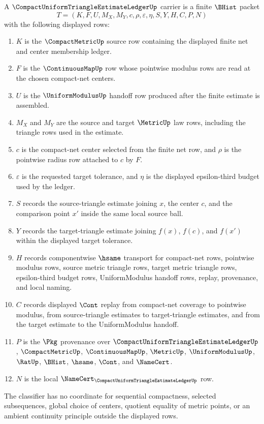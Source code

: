 \begin{definition}
\label{def:compact-uniform-triangle-estimate-ledger-carrier}
A $\CompactUniformTriangleEstimateLedgerUp$ carrier is a finite $\BHist$ packet
$$
T=(K,F,U,M_X,M_Y,c,\rho,\varepsilon,\eta,S,Y,H,C,P,N)
$$
with the following displayed rows:
\begin{enumerate}
\item $K$ is the $\CompactMetricUp$ source row containing the displayed finite net and center membership ledger.
\item $F$ is the $\ContinuousMapUp$ row whose pointwise modulus rows are read at the chosen compact-net centers.
\item $U$ is the $\UniformModulusUp$ handoff row produced after the finite estimate is assembled.
\item $M_X$ and $M_Y$ are the source and target $\MetricUp$ law rows, including the triangle rows used in the estimate.
\item $c$ is the compact-net center selected from the finite net row, and $\rho$ is the pointwise radius row attached to $c$ by $F$.
\item $\varepsilon$ is the requested target tolerance, and $\eta$ is the displayed epsilon-third budget used by the ledger.
\item $S$ records the source-triangle estimate joining $x$, the center $c$, and the comparison point $x'$ inside the same local source ball.
\item $Y$ records the target-triangle estimate joining $f(x)$, $f(c)$, and $f(x')$ within the displayed target tolerance.
\item $H$ records componentwise $\hsame$ transport for compact-net rows, pointwise modulus rows, source metric triangle rows, target metric triangle rows, epsilon-third budget rows, UniformModulus handoff rows, replay, provenance, and local naming.
\item $C$ records displayed $\Cont$ replay from compact-net coverage to pointwise modulus, from source-triangle estimates to target-triangle estimates, and from the target estimate to the UniformModulus handoff.
\item $P$ is the $\Pkg$ provenance over $\CompactUniformTriangleEstimateLedgerUp$, $\CompactMetricUp$, $\ContinuousMapUp$, $\MetricUp$, $\UniformModulusUp$, $\RatUp$, $\BHist$, $\hsame$, $\Cont$, and $\NameCert$.
\item $N$ is the local $\NameCert_{\CompactUniformTriangleEstimateLedgerUp}$ row.
\end{enumerate}
The classifier has no coordinate for sequential compactness, selected subsequences, global choice of centers, quotient equality of metric points, or an ambient continuity principle outside the displayed rows.
\end{definition}

